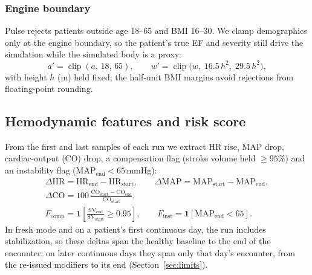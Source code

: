\documentclass[conference]{IEEEtran}
\begin{document}
\subsubsection{Engine boundary}
Pulse rejects patients outside age 18--65 and BMI 16--30. We clamp demographics only at the engine boundary, so the patient's true EF and severity still drive the simulation while the simulated body is a proxy:
\begin{equation}
a'=\operatorname{clip}(a,\,18,\,65),\qquad w'=\operatorname{clip}\big(w,\;16.5\,h^2,\;29.5\,h^2\big),
\label{eq:clamp}
\end{equation}
with height $h$ (m) held fixed; the half-unit BMI margins avoid rejections from floating-point rounding.

\subsection{Hemodynamic features and risk score}
From the first and last samples of each run we extract HR rise, MAP drop, cardiac-output (CO) drop, a compensation flag (stroke volume held $\geq95\%$) and an instability flag (MAP$_{\text{end}}<65$\,mmHg):
\begin{equation}
\begin{gathered}
\Delta\text{HR}=\text{HR}_{\text{end}}-\text{HR}_{\text{start}},\qquad \Delta\text{MAP}=\text{MAP}_{\text{start}}-\text{MAP}_{\text{end}},\\
\Delta\text{CO}=100\,\frac{\text{CO}_{\text{start}}-\text{CO}_{\text{end}}}{\text{CO}_{\text{start}}},\\
F_{\text{comp}}=\mathbf{1}\!\left[\frac{\text{SV}_{\text{end}}}{\text{SV}_{\text{start}}}\ge0.95\right],\qquad F_{\text{inst}}=\mathbf{1}\!\left[\text{MAP}_{\text{end}}<65\right].
\end{gathered}
\label{eq:features}
\end{equation}
In fresh mode and on a patient's first continuous day, the run includes stabilization, so these deltas span the healthy baseline to the end of the encounter; on later continuous days they span only that day's encounter, from the re-issued modifiers to its end (Section~\ref{sec:limits}).
\end{document}
